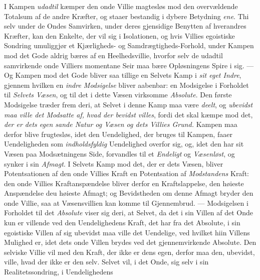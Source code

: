 I Kampen \emph{udadtil} kæmper den onde Villie magtesløs mod den overvældende
Totalsum af de andre Kræfter, og staaer bestandig i dybere Betydning \emph{ene}.
Thi selv under de Ondes Samvirken, under deres gjensidige Benytten af hverandres
Kræfter, kan den Enkelte, der vil sig i Isolationen, og hvis Villies egoistiske
Sondring umuliggjør et Kjærligheds- og Samdrægtigheds-Forhold, under Kampen mod
det Gode aldrig bæres af en Heelhedsvillie, hvorfor selv de udadtil samvirkende
onde Villiers momentane Seir
 maa bære Opløsningens Spire i sig. --- Og Kampen mod det Gode bliver saa tillige
en Selvets Kamp i \emph{sit eget Indre}, gjennem hvilken en \emph{indre
Modsigelse} bliver aabenbar: en Modsigelse i Forholdet til \emph{Selvets Væsen},
og til det i dette Væsen virksomme \emph{Absolute}. Den første Modsigelse træder
frem deri, at Selvet i denne Kamp maa være \emph{deelt}, og \emph{ubevidst maa
ville det Modsatte af, hvad der bevidst villes}, fordi det skal kæmpe mod det,
\emph{der er dets egen sande Natur og Væsen og dets Villies Grund.} Kampen maa
derfor blive frugtesløs, idet den Uendelighed, der bruges til Kampen, faaer
Uendeligheden som \emph{indholdsfyldig} Uendelighed overfor sig, og, idet den har
sit Væsen paa Modsætningens Side, forvandles til et \emph{Endeligt} og
\emph{Væsenløst}, og synker i sin \emph{Afmagt}. I Selvets Kamp mod det, der er
dets Væsen, bliver Potentsationen af den onde Villies Kraft en Potentsation af
\emph{Modstandens} Kraft: den onde Villies Kraftanspændelse bliver derfor en
Kraftslappelse, den høieste Anspændelse deu høieste Afmagt; og Bevidstheden om
denne Afmagt bryder den onde Villie, saa at Væsensvillien kan komme til
Gjennembrud. --- Modsigelsen i Forholdet til det \emph{Absolute} viser sig deri,
at Selvet, da det i sin Villen af det Onde kun er villende ved den Uendelighedens
Kraft, det har fra det Absolute, i sin egoistiske Villen af sig ubevidst maa
ville det Uendelige, ved hvilket hiin Villens Mulighed er, idet dets onde Villen
brydes ved det gjennemvirkende Absolute. Den selviske Villie vil med den Kraft,
der ikke er dens egen, derfor maa den, ubevidst, ville, hvad der ikke er den
selv. Selvet vil, i det Onde, sig selv i sin Realitetssondring, i Uendelighedens
